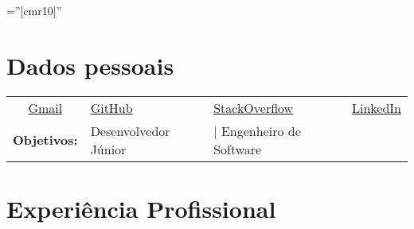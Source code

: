 \documentclass[a4paper,10pt]{article} %
\begin{document}
\pagestyle{empty} %

\font\fb=''[cmr10]'' %


\par{\bigskip\par} %

\section{Dados pessoais}

\begin{tabular}{clll}
	\faEnvelopeO \thinspace \href{mailto:yurimathe.yp@gmail.com}{Gmail}
	& \faGithub \thinspace \href{https://github.com/Yuri-M-Dias}{GitHub}
	& \faStackOverflow \thinspace \href{http://stackoverflow.com/users/story/3312701}{StackOverflow}
	& \faLinkedin \thinspace \href{https://www.linkedin.com/in/yuri-pereira-b5b589a8/}{LinkedIn} \\
	\bf Objetivos: & Desenvolvedor Júnior & | Engenheiro de Software & \\
\end{tabular}


\section{Experiência Profissional}
\end{document}
